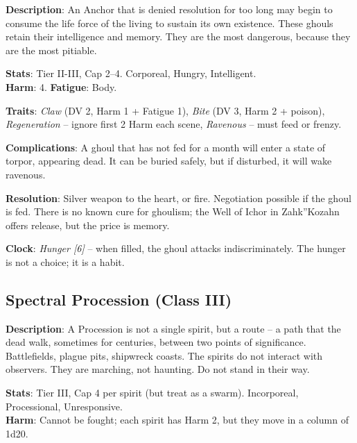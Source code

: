 \noindent\textbf{Description}: An Anchor that is denied resolution for too long may begin to consume the life force of the living to sustain its own existence. These ghouls retain their intelligence and memory. They are the most dangerous, because they are the most pitiable.

\noindent\textbf{Stats}: Tier II-III, Cap 2--4. Corporeal, Hungry, Intelligent.\\
\textbf{Harm}: 4. \textbf{Fatigue}: Body.

\noindent\textbf{Traits}: 
\emph{Claw} (DV 2, Harm 1 + Fatigue 1), \emph{Bite} (DV 3, Harm 2 + poison), \emph{Regeneration} -- ignore first 2 Harm each scene, \emph{Ravenous} -- must feed or frenzy.

\noindent\textbf{Complications}: A ghoul that has not fed for a month will enter a state of torpor, appearing dead. It can be buried safely, but if disturbed, it will wake ravenous.

\noindent\textbf{Resolution}: Silver weapon to the heart, or fire. Negotiation possible if the ghoul is fed. There is no known cure for ghoulism; the Well of Ichor in Zahk''Kozahn offers release, but the price is memory.

\noindent\textbf{Clock}: \emph{Hunger [6]} -- when filled, the ghoul attacks indiscriminately. The hunger is not a choice; it is a habit.


\subsection*{Spectral Procession (Class III)}

\noindent\textbf{Description}: A Procession is not a single spirit, but a route -- a path that the dead walk, sometimes for centuries, between two points of significance. Battlefields, plague pits, shipwreck coasts. The spirits do not interact with observers. They are marching, not haunting. Do not stand in their way.

\noindent\textbf{Stats}: Tier III, Cap 4 per spirit (but treat as a swarm). Incorporeal, Processional, Unresponsive.\\
\textbf{Harm}: Cannot be fought; each spirit has Harm 2, but they move in a column of 1d20.

